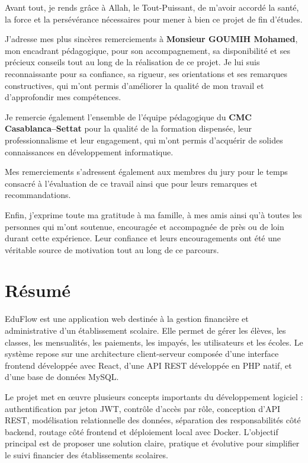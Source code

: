 \documentclass[12pt,a4paper]{report}
\begin{document}
Avant tout, je rends grâce à Allah, le Tout-Puissant, de m'avoir accordé la santé, la force et la persévérance nécessaires pour mener à bien ce projet de fin d'études.

J'adresse mes plus sincères remerciements à \textbf{Monsieur GOUMIH Mohamed}, mon encadrant pédagogique, pour son accompagnement, sa disponibilité et ses précieux conseils tout au long de la réalisation de ce projet. Je lui suis reconnaissante pour sa confiance, sa rigueur, ses orientations et ses remarques constructives, qui m'ont permis d'améliorer la qualité de mon travail et d'approfondir mes compétences.

Je remercie également l'ensemble de l'équipe pédagogique du \textbf{CMC Casablanca–Settat} pour la qualité de la formation dispensée, leur professionnalisme et leur engagement, qui m'ont permis d'acquérir de solides connaissances en développement informatique.

Mes remerciements s'adressent également aux membres du jury pour le temps consacré à l'évaluation de ce travail ainsi que pour leurs remarques et recommandations.

Enfin, j'exprime toute ma gratitude à ma famille, à mes amis ainsi qu'à toutes les personnes qui m'ont soutenue, encouragée et accompagnée de près ou de loin durant cette expérience. Leur confiance et leurs encouragements ont été une véritable source de motivation tout au long de ce parcours.

\chapter*{Résumé}

EduFlow est une application web destinée à la gestion financière et administrative d'un établissement scolaire. Elle permet de gérer les élèves, les classes, les mensualités, les paiements, les impayés, les utilisateurs et les écoles. Le système repose sur une architecture client-serveur composée d'une interface frontend développée avec React, d'une API REST développée en PHP natif, et d'une base de données MySQL.

Le projet met en œuvre plusieurs concepts importants du développement logiciel : authentification par jeton JWT, contrôle d'accès par rôle, conception d'API REST, modélisation relationnelle des données, séparation des responsabilités côté backend, routage côté frontend et déploiement local avec Docker. L'objectif principal est de proposer une solution claire, pratique et évolutive pour simplifier le suivi financier des établissements scolaires.
\end{document}
